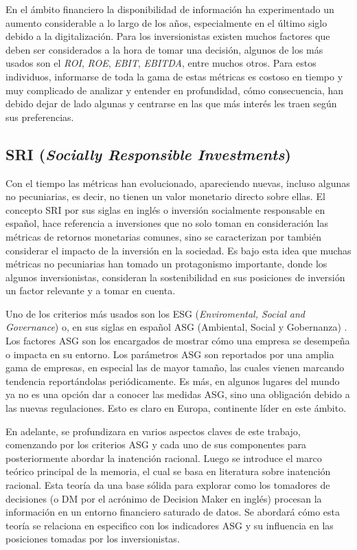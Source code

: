 En el ámbito financiero la disponibilidad de información ha experimentado un aumento considerable a lo largo de los años, especialmente en el último siglo  debido a la digitalización. Para los inversionistas existen muchos factores que deben ser considerados a la hora de tomar una decisión, algunos de los más usados son el \textit{ROI}, \textit{ROE}, \textit{EBIT}, \textit{EBITDA}, entre muchos otros. Para estos individuos, informarse de toda la gama de estas métricas es costoso en tiempo y muy complicado de analizar y entender en profundidad, cómo consecuencia, han debido dejar de lado algunas y centrarse en las que más interés les traen según sus preferencias. 


\subsection{SRI (\textit{Socially Responsible Investments})}
Con el tiempo las métricas han evolucionado, apareciendo nuevas, incluso algunas no pecuniarias, es decir, no tienen un valor monetario directo sobre ellas. El concepto SRI por sus siglas en inglés o inversión socialmente responsable en español, hace referencia a inversiones que no solo toman en consideración las métricas de retornos monetarias comunes, sino se caracterizan por también considerar el impacto de la inversión en la sociedad. Es bajo esta idea que muchas métricas no pecuniarias han tomado un protagonismo importante, donde los algunos inversionistas, consideran la sostenibilidad en sus posiciones de inversión un factor relevante y a tomar en cuenta. 


Uno de los criterios más usados son los ESG (\textit{Enviromental, Social and Governance}) o, en sus siglas en español ASG (Ambiental, Social y Gobernanza) . Los factores ASG son los encargados de mostrar cómo una empresa se desempeña o impacta en su entorno. Los parámetros ASG son reportados por una amplia gama de empresas, en especial las de mayor tamaño, las cuales vienen marcando tendencia reportándolas periódicamente. Es más, en algunos lugares del mundo ya no es una opción dar a conocer las medidas ASG, sino una obligación debido a las nuevas regulaciones. Esto es claro en Europa, continente líder en este ámbito.

En adelante, se profundizara en varios aspectos claves de este trabajo, comenzando por los criterios ASG y cada uno de sus componentes para posteriormente abordar la inatención racional. Luego se introduce el marco teórico principal de la memoria, el cual se basa en literatura sobre inatención racional. Esta teoría da una base sólida para explorar como los tomadores de decisiones (o DM por el acrónimo de Decision Maker en inglés) procesan la información en un entorno financiero saturado de datos. Se abordará cómo esta teoría se relaciona en especifico con los indicadores ASG y su influencia en las posiciones tomadas por los inversionistas.

